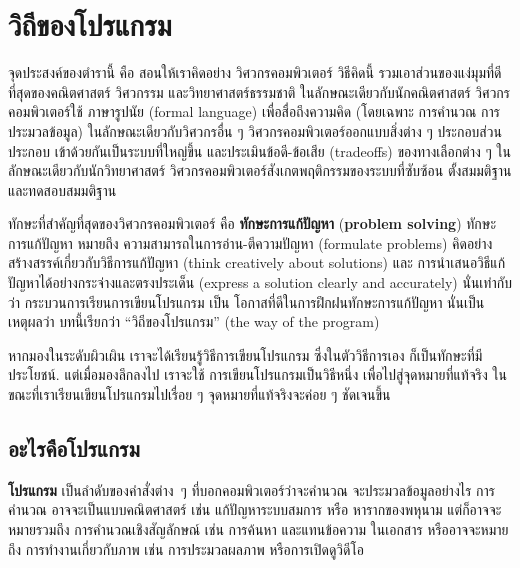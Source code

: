 \normalsize
\clearemptydoublepage

\begin{latexonly}

\tableofcontents

\clearemptydoublepage

\end{latexonly}

\mainmatter

\chapter{วิถีของโปรแกรม}%

จุดประสงค์ของตำรานี้ คือ สอนให้เราคิดอย่าง%
วิศวกรคอมพิวเตอร์ 
วิธีคิดนี้ รวมเอาส่วนของแง่มุมที่ดีที่สุดของคณิตศาสตร์ วิศวกรรม และวิทยาศาสตร์ธรรมชาติ ในลักษณะเดียวกับนักคณิตศาสตร์ วิศวกรคอมพิวเตอร์ใช้ ภาษารูปนัย (formal language) เพื่อสื่อถึงความคิด (โดยเฉพาะ การคำนวณ การประมวลข้อมูล) ในลักษณะเดียวกับวิศวกรอื่น ๆ วิศวกรคอมพิวเตอร์ออกแบบสิ่งต่าง ๆ ประกอบส่วนประกอบ เข้าด้วยกันเป็นระบบที่ใหญ่ขึ้น และประเมินข้อดี-ข้อเสีย (tradeoffs) ของทางเลือกต่าง ๆ
ในลักษณะเดียวกับนักวิทยาศาสตร์ วิศวกรคอมพิวเตอร์สังเกตพฤติกรรมของระบบที่ซับซ้อน ตั้งสมมติฐาน และทดสอบสมมติฐาน

ทักษะที่สำคัญที่สุดของวิศวกรคอมพิวเตอร์ คือ {\bf ทักษะการแก้ปัญหา} (\textbf{problem solving})
ทักษะการแก้ปัญหา หมายถึง ความสามารถในการอ่าน-ตีความปัญหา (formulate problems) คิดอย่างสร้างสรรค์เกี่ยวกับวิธีการแก้ปัญหา (think creatively about solutions) และ การนำเสนอวิธีแก้ปัญหาได้อย่างกระจ่างและตรงประเด็น (express a solution clearly and accurately) 
%
นั่นเท่ากับว่า กระบวนการเรียนการเขียนโปรแกรม เป็น โอกาสที่ดีในการฝึกฝนทักษะการแก้ปัญหา นั่นเป็นเหตุผลว่า บทนี้เรียกว่า ``วิถีของโปรแกรม'' (the way of the program)

หากมองในระดับผิวเผิน เราจะได้เรียนรู้วิธีการเขียนโปรแกรม ซึ่งในตัววิธีการเอง ก็เป็นทักษะที่มีประโยชน์. แต่เมื่อมองลึกลงไป เราจะใช้ การเขียนโปรแกรมเป็นวิธีหนึ่ง เพื่อไปสู่จุดหมายที่แท้จริง ในขณะที่เราเรียนเขียนโปรแกรมไปเรื่อย ๆ จุดหมายที่แท้จริงจะค่อย ๆ ชัดเจนขึ้น  

\section{อะไรคือโปรแกรม}

\textbf{โปรแกรม} เป็นลำดับของคำสั่งต่าง~ๆ ที่บอกคอมพิวเตอร์ว่าจะคำนวณ จะประมวลข้อมูลอย่างไร
การคำนวณ อาจจะเป็นแบบคณิตศาสตร์ เช่น แก้ปัญหาระบบสมการ หรือ หารากของพหุนาม 
แต่ก็อาจจะหมายรวมถึง การคำนวณเชิงสัญลักษณ์ เช่น การค้นหา และแทนข้อความ ในเอกสาร หรืออาจจะหมายถึง การทำงานเกี่ยวกับภาพ เช่น การประมวลผลภาพ หรือการเปิดดูวิดีโอ

